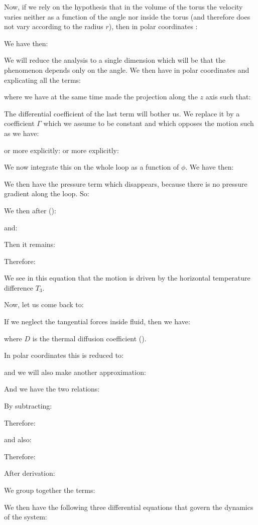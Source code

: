 	Now, if we rely on the hypothesis that in the volume of the torus the velocity varies neither as a function of the angle nor inside the torus (and therefore does not vary according to the radius $r$), then in polar coordinates :
	
	We have then:
	
	We will reduce the analysis to a single dimension which will be that the phenomenon depends only on the angle. We then have in polar coordinates and explicating all the terms:
	
	where we have at the same time made the projection along the $z$ axis such that:
	
	The differential coefficient of the last term will bother us. We replace it by a coefficient $\Gamma$ which we assume to be constant and which opposes the motion such as we have:
	
	or more explicitly:
	or more explicitly:
	
	We now integrate this on the whole loop as a function of $\phi$. We have then:
	
	We then have the pressure term which disappears, because there is no pressure gradient along the loop. So:
	
	We then after ():
	
	and:
	
	Then it remains:
	
	Therefore:
	
	We see in this equation that the motion is driven by the horizontal temperature difference $T_3$.

	Now, let us come back to:
	
	If we neglect the tangential forces inside fluid, then we have:
	
	where $D$ is the thermal diffusion coefficient ().

	In polar coordinates this is reduced to:
	
	and we will also make another approximation:
	
	And we have the two relations:
	
	By subtracting:
	
	Therefore:
	
	and also:
	
	Therefore:
	
	After derivation:
	
	We group together the terms:
	
	We then have the following three differential equations that govern the dynamics of the system:
	
